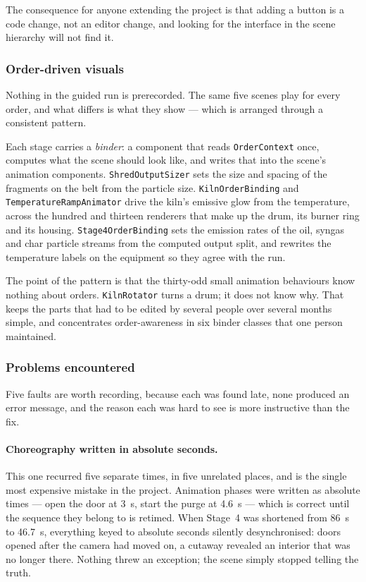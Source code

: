 The consequence for anyone extending the project is that adding a button is a code change, not an editor change, and looking for the interface in the scene hierarchy will not find it.

\subsubsection{Order-driven visuals}
\label{sec:binders}

Nothing in the guided run is prerecorded. The same five scenes play for every order, and what differs is what they show --- which is arranged through a consistent pattern.

Each stage carries a \emph{binder}: a component that reads
\texttt{OrderContext} once, computes what the scene should look like, and writes that into the scene's animation components. \texttt{ShredOutputSizer} sets the size and spacing of the fragments on the belt from the particle size. \texttt{KilnOrderBinding} and \texttt{TemperatureRampAnimator} drive the kiln's
emissive glow from the temperature, across the hundred and thirteen renderers that make up the drum, its burner ring and its housing.
\texttt{Stage4OrderBinding} sets the emission rates of the oil, syngas and char particle streams from the computed output split, and rewrites the temperature labels on the equipment so they agree with the run.

The point of the pattern is that the thirty-odd small animation behaviours know nothing about orders. \texttt{KilnRotator} turns a drum; it does not know why. That keeps the parts that had to be edited by several people over several months simple, and concentrates order-awareness in six binder classes that one person maintained.

\subsubsection{Problems encountered}

Five faults are worth recording, because each was found late, none produced an error message, and the reason each was hard to see is more instructive than the fix.

\paragraph{Choreography written in absolute seconds.}
This one recurred five separate times, in five unrelated places, and is the single most expensive mistake in the project. Animation phases were written as absolute times --- open the door at \SI{3}{s}, start the purge at \SI{4.6}{s} --- which is correct until the sequence they belong to is retimed. When Stage~4 was shortened from \SI{86}{s} to \SI{46.7}{s}, everything keyed to absolute seconds silently desynchronised: doors opened after the camera had moved on, a cutaway revealed an interior that was no longer there. Nothing threw an exception; the scene simply stopped telling the truth.

